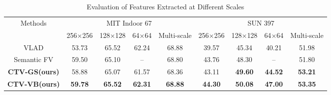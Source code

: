 \documentclass[journal]{IEEEtran}
\begin{document}
\begin{table*}[!t]
\centering
\caption{Evaluation of Features Extracted at Different Scales}
\label{Table:scales}
    \begin{tabular}{c|c|c|c|c|c|c|c|c}
    \hline
    \multirow{2}{2cm}{Methods} & \multicolumn{4}{c|}{MIT Indoor 67}      & \multicolumn{4}{c}{SUN 397}           \\ \cline{2-9}
                                          & 256$\times$256 & 128$\times$128 & 64$\times$64 & Multi-scale & 256$\times$256 & 128$\times$128 & 64$\times$64 & Multi-scale \\
    \hline \hline
        VLAD\cite{gong2014multi}          & 53.73         & 65.52 & 62.24 & 68.88  & 39.57          & 45.34            & 40.21          & 51.98                \\
        Semantic FV\cite{dixit2015scene}  & 59.50 & 65.10          & --             & 68.80           & 43.76          & 48.30            & --             & 51.80                \\
        \textbf{CTV-GS(ours)}             & 58.88         & 65.07          & 61.57          & 68.36           & 43.11          & \textbf{49.60}   & \textbf{44.52} & \textbf{53.21}       \\
        \textbf{CTV-VB(ours)}             & \textbf{59.78}         & \textbf{65.52}          & \textbf{62.31}          & \textbf{68.88}           & \textbf{44.30} & \textbf{50.08}   & \textbf{47.00} & \textbf{53.35}       \\
    \hline \hline
    \end{tabular}
\end{table*}
\end{document}
